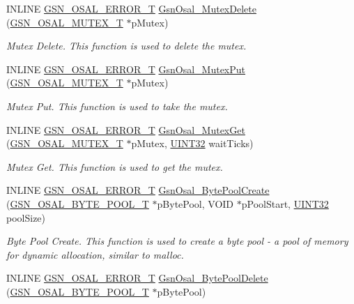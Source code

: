 \begin{DoxyCompactItemize}
INLINE \hyperlink{a00659_ga36216a7aacd1d5024bc7b8bf39c3f46b}{GSN\_\-OSAL\_\-ERROR\_\-T} \hyperlink{a00628_ga2d2347555ec07007912ccd61ea62f16a}{GsnOsal\_\-MutexDelete} (\hyperlink{a00628_gae997291afc7166c897f459023e0154ad}{GSN\_\-OSAL\_\-MUTEX\_\-T} $\ast$pMutex)
\begin{DoxyCompactList}\small\item\em Mutex Delete. This function is used to delete the mutex. \end{DoxyCompactList}\item 
INLINE \hyperlink{a00659_ga36216a7aacd1d5024bc7b8bf39c3f46b}{GSN\_\-OSAL\_\-ERROR\_\-T} \hyperlink{a00628_ga0440cf06602f2a414ea1c20a05f139d0}{GsnOsal\_\-MutexPut} (\hyperlink{a00628_gae997291afc7166c897f459023e0154ad}{GSN\_\-OSAL\_\-MUTEX\_\-T} $\ast$pMutex)
\begin{DoxyCompactList}\small\item\em Mutex Put. This function is used to take the mutex. \end{DoxyCompactList}\item 
INLINE \hyperlink{a00659_ga36216a7aacd1d5024bc7b8bf39c3f46b}{GSN\_\-OSAL\_\-ERROR\_\-T} \hyperlink{a00628_ga0528eb3552c6d3ece518c9662ffb143a}{GsnOsal\_\-MutexGet} (\hyperlink{a00628_gae997291afc7166c897f459023e0154ad}{GSN\_\-OSAL\_\-MUTEX\_\-T} $\ast$pMutex, \hyperlink{a00660_gae1e6edbbc26d6fbc71a90190d0266018}{UINT32} waitTicks)
\begin{DoxyCompactList}\small\item\em Mutex Get. This function is used to get the mutex. \end{DoxyCompactList}\item 
INLINE \hyperlink{a00659_ga36216a7aacd1d5024bc7b8bf39c3f46b}{GSN\_\-OSAL\_\-ERROR\_\-T} \hyperlink{a00628_ga7a19fa807183b26dc8566a06a44acf38}{GsnOsal\_\-BytePoolCreate} (\hyperlink{a00628_gaf2af06408f9cf286dc400b5957264f00}{GSN\_\-OSAL\_\-BYTE\_\-POOL\_\-T} $\ast$pBytePool, VOID $\ast$pPoolStart, \hyperlink{a00660_gae1e6edbbc26d6fbc71a90190d0266018}{UINT32} poolSize)
\begin{DoxyCompactList}\small\item\em Byte Pool Create. This function is used to create a byte pool -\/ a pool of memory for dynamic allocation, similar to malloc. \end{DoxyCompactList}\item 
INLINE \hyperlink{a00659_ga36216a7aacd1d5024bc7b8bf39c3f46b}{GSN\_\-OSAL\_\-ERROR\_\-T} \hyperlink{a00628_ga159b4fdceeb3ce96aa80561bb380987e}{GsnOsal\_\-BytePoolDelete} (\hyperlink{a00628_gaf2af06408f9cf286dc400b5957264f00}{GSN\_\-OSAL\_\-BYTE\_\-POOL\_\-T} $\ast$pBytePool)

\end{DoxyCompactItemize}

